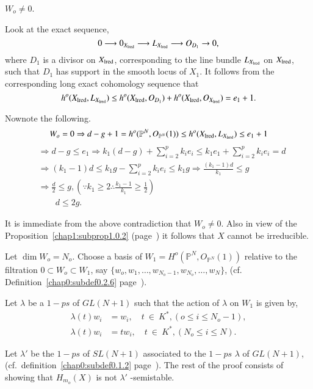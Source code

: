 \medskip
{}
$W_o \neq 0$.

\medskip
{}
Look at the exact sequence, 
$$
0 \longrightarrow 0_{X_{\rm lred}}  \longrightarrow L_{X_{\rm lred}}
\longrightarrow O_{D_1} \rightarrow 0, 
$$ 
where $D_1$ is a divisor on $X_{\rm lred}$, corresponding to the line bundle
$L_{X_{\rm lred}}$ on $X_{\rm lred}$, such that $D_1$ has support in the
smooth locus of $X_1$. It follows from the corresponding long exact
cohomology sequence that  
$$
h^o (X_{\rm lred}, L_{X_{\rm lred}}) \le h^o (X_{\rm lred}, O_{D_1}) + h^o 
(X_{\rm lred}, O_{X_{\rm lred}}) = e_1 +1.  
$$

\noindent
Now\pageoriginale note the following. 
$$
W_o = 0 \Rightarrow d-g+1 = h^o(\mathbb{P}^N, O_{\mathbb{P}^N}(1))
\le h^o (X_{\rm lred}, L_{X_{\rm lred}}) \le e_1+1 
$$ 
\begin{align*}
&\Rightarrow d-g \le e_1 \Rightarrow k_1 (d-g) + \sum_{i=2}^{p} k_i e_i
  \le k_1 e_1 + \sum_{i=2}^p k_i e_i =d\\ 
&\Rightarrow (k_1-1)d \le k_1g - \sum_{i=2}^{p} k_i e_i \le k_1g
  \Rightarrow  \frac{(k_1-1)d}{k_1} \le g\\ 
&\Rightarrow \frac{d}{2} \le g ,  (\because k_1 \ge 2 \therefore
  \frac{k_1-1}{k_1} \ge \frac{1}{2})\\[3pt]
& \qquad  d \le 2g .  
\end{align*}

It is immediate from the above contradiction that $W_o \neq 0$. Also
in view of the Proposition~\ref{chap1:subprop1.0.2} 
(page~\pageref{chap1:subprop1.0.2}) it follows that $X$ 
cannot be irreducible. 

Let $\dim W_o = N_o$. Choose a basis of $W_1 = H^o ( \mathbb{P}^N,
O_{\mathbb{P}^N}(1))$ relative to the filtration $0 \subset W_o
\subset W_1$, say $\{w_o , w_1, \ldots , w_{N_o-1}, w_{N_o}, \ldots , w_N\}$,
(cf. Definition~\ref{chap0:subdef0.2.6} page~\pageref{chap0:subdef0.2.6}).  

\noindent
Let $\lambda$ be a $1-ps$ of $GL(N+1)$ such that the action of
$\lambda$ on $W_1$ is given by,  
\begin{align*}
\lambda (t)w_i & = w_i, \quad t ~\in ~K^*, (o \le i \le N_o -1),\\
\lambda (t)w_i & = tw_i, \quad t ~\in ~K^*, (N_o \le i \le N).
\end{align*}

\noindent
Let $\lambda'$ be the $1-ps$ of $SL(N+1)$ associated to the $1-ps$
$\lambda$ of $GL(N+1)$, (cf.\ definition~\ref{chap0:subdef0.1.2} 
page~\pageref{chap0:subdef0.1.2}). The 
rest of the proof consists of showing that $H_{m_o}(X)$ is not
$\lambda'$ -semistable. 

